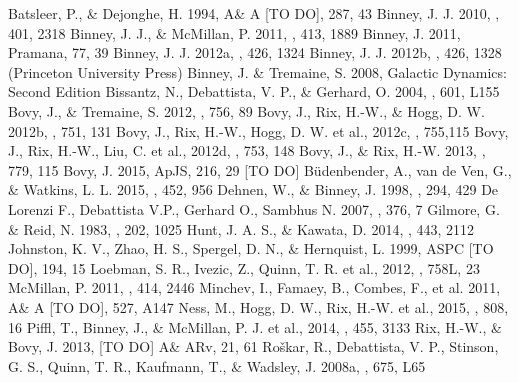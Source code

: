 \documentclass[12pt,preprint]{aastex}
\begin{document}
\begin{thebibliography}{}
 Batsleer, P., \& Dejonghe, H. 1994, A\& A [TO DO], 287, 43
 Binney, J. J. 2010, \mnras, 401, 2318
 Binney, J. J., \& McMillan, P. 2011, \mnras, 413, 1889
 Binney, J. 2011, Pramana, 77, 39
 Binney, J. J. 2012a, \mnras, 426, 1324
 Binney, J. J. 2012b, \mnras, 426, 1328 (Princeton University Press)
 Binney, J. \& Tremaine, S. 2008, Galactic Dynamics: Second Edition
 Bissantz, N., Debattista, V. P., \& Gerhard, O. 2004, \apj, 601, L155
 Bovy, J., \& Tremaine, S. 2012, \apj, 756, 89
 Bovy, J., Rix, H.-W., \& Hogg, D. W. 2012b, \apj, 751, 131
 Bovy, J., Rix, H.-W., Hogg, D. W. et al., 2012c, \apj, 755,115
 Bovy, J., Rix, H.-W., Liu, C. et al., 2012d, \apj, 753, 148
  Bovy, J., \& Rix, H.-W. 2013, \apj, 779, 115
 Bovy, J. 2015, ApJS, 216, 29 [TO DO]
 B\"{u}denbender, A., van de Ven, G., \& Watkins, L. L. 2015, \mnras, 452, 956
 Dehnen, W., \& Binney, J. 1998, \mnras, 294, 429
 De Lorenzi F., Debattista V.P., Gerhard O., Sambhus N. 2007, \mnras, 376, 7
 Gilmore, G. \& Reid, N. 1983, \mnras, 202, 1025
 Hunt, J. A. S., \& Kawata, D. 2014, \mnras, 443, 2112
 Johnston, K. V., Zhao, H. S., Spergel, D. N., \& Hernquist, L. 1999, ASPC [TO DO], 194, 15
 Loebman, S. R., Ivezic, Z., Quinn, T. R. et al., 2012, \apj, 758L, 23
 McMillan, P. 2011, \mnras, 414, 2446
 Minchev, I., Famaey, B., Combes, F., et al. 2011, A\& A [TO DO], 527, A147
 Ness, M., Hogg, D. W., Rix, H.-W. et al., 2015, \apj, 808, 16
 Piffl, T., Binney, J., \& McMillan, P. J. et al., 2014, \mnras, 455, 3133
 Rix, H.-W., \& Bovy, J. 2013, [TO DO] A\& ARv, 21, 61
 Ro\v{s}kar, R., Debattista, V. P., Stinson, G. S., Quinn, T. R., Kaufmann, T., \& Wadsley, J. 2008a, \apj, 675, L65

\end{thebibliography}
\end{document}
